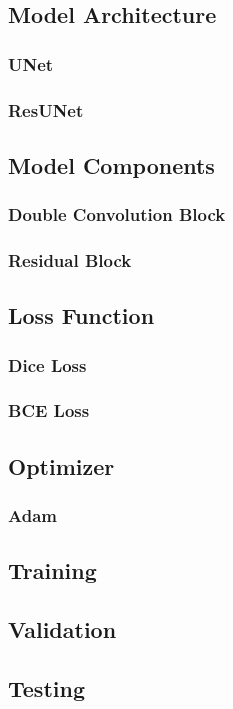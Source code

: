 \subsection{Model Architecture}

\subsubsection{UNet}

\subsubsection{ResUNet}

\subsection{Model Components}

\subsubsection{Double Convolution Block}

\subsubsection{Residual Block}

\subsection{Loss Function}

\subsubsection{Dice Loss}

\subsubsection{BCE Loss}

\subsection{Optimizer}

\subsubsection{Adam}

\subsection{Training}

\subsection{Validation}

\subsection{Testing}

